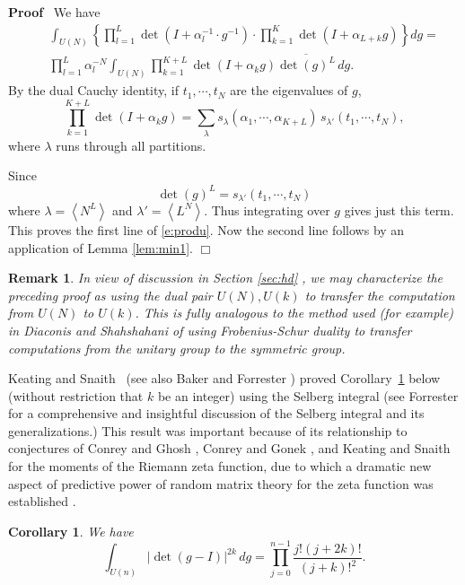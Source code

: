 \documentclass[11pt]{amsart}
\renewenvironment{proof}{
\noindent\textbf{Proof}\ }{\hspace*{\fill}
\begin{math}\Box\end{math}\medskip}
\newtheorem{varremark}{Remark}
\newenvironment{remark}{\begin{varremark}\em}{\em\end{varremark}}
\newtheorem{corollary}{Corollary}
\begin{document}
\begin{proof}
We have
\begin{eqnarray*}
   &  & \int_{U ( N )}  \left\{ \prod_{l = 1}^L \det ( I + \alpha_l^{-
1} \cdot
   g^{- 1} ) \cdot \prod_{k = 1}^K \det ( I + \alpha_{L + k}g)\right\}  dg =\\
   &  & \prod_{l = 1}^L \alpha_l^{-N}
   \int_{U ( N )}\prod_{k = 1}^{K + L} \det ( I + \alpha_k g ) \overline{\det ( g )^L}
   \, d g.
\end{eqnarray*}
By the dual Cauchy identity, if $t_1, \cdots, t_N$ are the
eigenvalues of $g$,
\[ \prod_{k = 1}^{K + L} \det ( I + \alpha_k g ) = \sum_{\lambda}
s_{\lambda}( \alpha_1, \cdots, \alpha_{K+L}) \, s_{\lambda'} (
t_1, \cdots, t_N ), \] where $\lambda$ runs through all
partitions.

  Since
\[ \det ( g )^L = s_{\lambda'} ( t_1, \cdots, t_N) \]
where $\lambda = \left\langle N^L\right\rangle$ and $\lambda' =
\left\langle L^N \right\rangle$. Thus integrating over $g$ gives
just this term.  This proves the first line of \eqref{e:produ}.
Now the second line follows by an application of Lemma
\ref{lem:min1}.
\end{proof}

\begin{remark}
In view of discussion in Section \ref{sec:hd} , we may
characterize the preceding proof as using the dual pair $U ( N ),
U ( k )$ to transfer the computation from $U ( N )$ to $U ( k )$.
This is fully analogous to the method used (for example) in
Diaconis and Shahshahani {\cite{DS94}} of using Frobenius-Schur
duality to transfer computations from the unitary group to the
symmetric group.
\end{remark}



Keating and Snaith~{\cite{KS00a}} (see also Baker and Forrester
\cite{BF97}) proved Corollary~\ref{ratioskeatingsnaith} below
(without restriction that $k$ be an integer) using the Selberg
integral (see Forrester \cite{Fo02} for a comprehensive and
insightful discussion of the Selberg integral and its
generalizations.) This result was important because of its
relationship to conjectures of Conrey and Ghosh \cite{CG98},
Conrey and Gonek \cite{CoGo01}, and Keating and
Snaith~{\cite{KS00a}}  for the moments of the Riemann zeta
function, due to which a dramatic new aspect of predictive power
of random matrix theory for the zeta function was established .

\begin{corollary}
\label{ratioskeatingsnaith} We have
\begin{equation}
   \label{ksformula} \int_{U ( n )} | \det ( g - I ) |^{2 k} \, d g =
   \prod_{j = 0}^{n - 1} \frac{j! ( j + 2 k ) !}{( j + k ) !^2} .
\end{equation}
\end{corollary}
\end{document}
